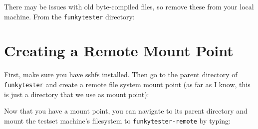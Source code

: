 \documentclass{report}
\begin{document}
\begin{appendices}
  	
There may be issues with old byte-compiled files, so remove these from your local machine. From the \texttt{funkytester} directory:\\


\section{Creating a Remote Mount Point} \label{sec:fsmount}
First, make sure you have sshfs installed. Then go to the parent directory of \texttt{funkytester} and create a remote file system mount point (as far as I know, this is just a directory that we use as mount point):\\


Now that you have a mount point, you can navigate to its parent directory and mount the testset machine's filesystem to \texttt{funkytester-remote} by typing:\\



\end{appendices}
\end{document}
